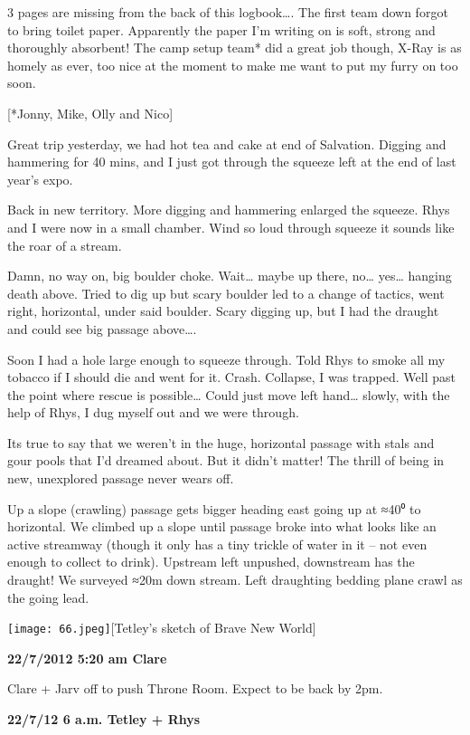 3 pages are missing from the back of this logbook\ldots{}. The first
team down forgot to bring toilet paper. Apparently the paper I'm writing
on is soft, strong and thoroughly absorbent! The camp setup team* did a
great job though, X-Ray is as homely as ever, too nice at the moment to
make me want to put my furry on too soon.

{[}*Jonny, Mike, Olly and Nico{]}

Great trip yesterday, we had hot tea and cake at end of Salvation.
Digging and hammering for 40 mins, and I just got through the squeeze
left at the end of last year's expo.

Back in new territory. More digging and hammering enlarged the squeeze.
Rhys and I were now in a small chamber. Wind so loud through squeeze it
sounds like the roar of a stream.

Damn, no way on, big boulder choke. Wait\ldots{} maybe up there,
no\ldots{} yes\ldots{} hanging death above. Tried to dig up but scary
boulder led to a change of tactics, went right, horizontal, under said
boulder. Scary digging up, but I had the draught and could see big
passage above\ldots{}.

Soon I had a hole large enough to squeeze through. Told Rhys to smoke
all my tobacco if I should die and went for it. Crash. Collapse, I was
trapped. Well past the point where rescue is possible\ldots{} Could just
move left hand\ldots{} slowly, with the help of Rhys, I dug myself out
and we were through.

Its true to say that we weren't in the huge, horizontal passage with
stals and gour pools that I'd dreamed about. But it didn't matter! The
thrill of being in new, unexplored passage never wears off.

Up a slope (crawling) passage gets bigger heading east going up at ≈40⁰
to horizontal. We climbed up a slope until passage broke into what looks
like an active streamway (though it only has a tiny trickle of water in
it -- not even enough to collect to drink). Upstream left unpushed,
downstream has the draught! We surveyed ≈20m down stream. Left
draughting bedding plane crawl as the going lead.

\texttt{[image: 66.jpeg]}{[}Tetley's sketch of Brave New World{]}

\textbf{22/7/2012 5:20 am Clare}

Clare + Jarv off to push Throne Room. Expect to be back by 2pm.

\textbf{22/7/12 6 a.m. Tetley + Rhys}

